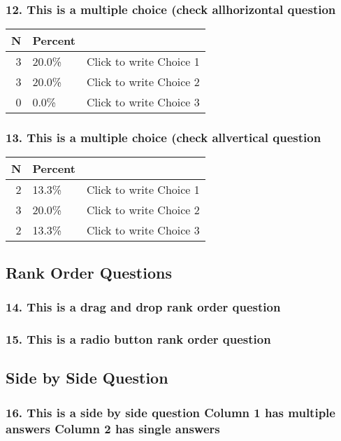 \documentclass{article}\usepackage[]{graphicx}\usepackage[]{color}
\begin{document}
\hfill \break \hfill \break
\subsubsection*{12.
This is a multiple choice (check allhorizontal question}

\begin{tabular}{r|l|l}
\hline
N & Percent & \\
\hline
3 & 20.0\% & Click to write Choice 1\\
\hline
3 & 20.0\% & Click to write Choice 2\\
\hline
0 & 0.0\% & Click to write Choice 3\\
\hline
\end{tabular}


\hfill \break \hfill \break
\subsubsection*{13.
This is a multiple choice (check allvertical question}

\begin{tabular}{r|l|l}
\hline
N & Percent & \\
\hline
2 & 13.3\% & Click to write Choice 1\\
\hline
3 & 20.0\% & Click to write Choice 2\\
\hline
2 & 13.3\% & Click to write Choice 3\\
\hline
\end{tabular}


\hfill \break \hfill \break
\subsection*{Rank Order Questions}
\subsubsection*{14.
This is a drag and drop rank order question}

\hfill \break \hfill \break
\subsubsection*{15.
This is a radio button rank order question}

\hfill \break \hfill \break
\subsection*{Side by Side Question}
\subsubsection*{16.
This is a side by side question Column 1 has multiple answers Column 2 has single answers}

\hfill \break \hfill \break
\end{document}
